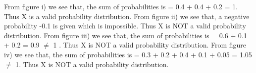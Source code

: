 \documentclass[journal,12pt,twocolumn]{IEEEtran}
\begin{document}
\subsection*{}\\
\begin{flushleft}
From figure i) we see that, the sum of probabilities is = 0.4 + 0.4 + 0.2 = 1.
\newline Thus X is a valid probability distribution.
\newline
\newline
From figure ii) we see that, a negative probability -0.1 is given which is impossible.
\newline Thus X is NOT a valid probability distribution.
\newline
\newline
From figure iii) we see that, the sum of probabilities is = 0.6 + 0.1 + 0.2 = 0.9 $\neq$ 1 .
\newline Thus X is NOT a valid probability distribution.
\newline
\newline
From figure iv) we see that, the sum of probabilities is = 0.3 + 0.2 + 0.4 + 0.1 + 0.05 = 1.05 $\neq$ 1.
\newline Thus X is NOT a valid probability distribution.
\newline
\end{flushleft}
\end{document}
